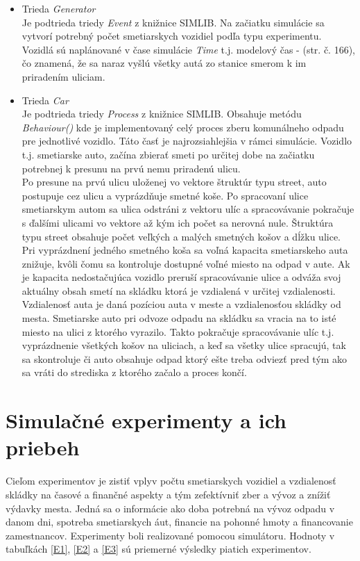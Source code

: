 \documentclass[11pt,a4paper]{article}
\begin{document}
    \begin{itemize}
        \item Trieda \textit{Generator}\\[0.1em]
              Je podtrieda triedy \textit{Event} z knižnice SIMLIB. Na začiatku simulácie sa vytvorí potrebný počet smetiarskych vozidiel podľa typu experimentu. Vozidlá sú naplánované v čase simulácie \textit{Time} t.j. modelový čas - \cite{IMS}(str. č. 166), čo znamená, že sa naraz vyšlú všetky autá zo stanice smerom k im priradením uliciam.
        \item Trieda \textit{Car}\\[0.1em]
              Je podtrieda triedy \textit{Process} z knižnice SIMLIB. Obsahuje metódu \textit{Behaviour()} kde je implementovaný celý proces zberu komunálneho odpadu pre jednotlivé vozidlo. Táto časť je najrozsiahlejšia v rámci simulácie. Vozidlo t.j. smetiarske auto, začína zbierať smeti po určitej dobe na začiatku potrebnej k presunu na prvú nemu priradenú ulicu.\\[0.3em]
              Po presune na prvú ulicu uloženej vo vektore štruktúr typu street, auto postupuje cez ulicu a vyprázdňuje smetné koše. Po spracovaní ulice smetiarskym autom sa ulica odstráni z vektoru ulíc a spracovávanie pokračuje s ďalšími ulicami vo vektore až kým ich počet sa nerovná nule. Štruktúra typu street obsahuje počet veľkých a malých smetných košov a dĺžku ulice. Pri vyprázdnení jedného smetného koša sa voľná kapacita smetiarskeho auta znižuje, kvôli čomu sa kontroluje dostupné voľné miesto na odpad v aute. Ak je kapacita nedostačujúca vozidlo preruší spracovávanie ulice a odváža svoj aktuálny obsah smetí na skládku ktorá je vzdialená v určitej vzdialenosti. Vzdialenosť auta je daná pozíciou auta v meste a vzdialenosťou skládky od mesta. Smetiarske auto pri odvoze odpadu na skládku sa vracia na to isté miesto na ulici z ktorého vyrazilo. Takto pokračuje spracovávanie ulíc t.j. vyprázdnenie všetkých košov na uliciach, a keď sa všetky ulice spracujú, tak sa skontroluje či auto obsahuje odpad ktorý ešte treba odviezť pred tým ako sa vráti do strediska z ktorého začalo a proces končí.
    \end{itemize}

\section{Simulačné experimenty a ich priebeh}

    \indent Cieľom experimentov je zistiť vplyv počtu smetiarskych vozidiel a vzdialenosť skládky na časové a finančné aspekty a tým zefektívniť zber a vývoz a znížiť výdavky mesta. Jedná sa o informácie ako doba potrebná na vývoz odpadu v danom dni, spotreba smetiarskych áut, financie na pohonné hmoty a financovanie zamestnancov. Experimenty boli realizované pomocou simulátoru. Hodnoty v tabuľkách \ref{E1}, \ref{E2} a \ref{E3} sú priemerné výsledky piatich experimentov.
\end{document}
